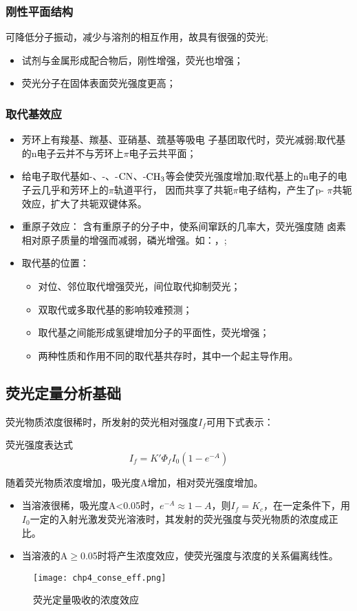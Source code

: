 \subsubsection{刚性平面结构}
可降低分子振动，减少与溶剂的相互作用，故具有很强的荧光;
\begin{itemize}
	\item 试剂与金属形成配合物后，刚性增强，荧光也增强；
	\item 荧光分子在固体表面荧光强度更高；
\end{itemize}
\subsubsection{取代基效应}
\begin{itemize}
	\item 芳环上有羧基、羰基、亚硝基、巯基等吸电 子基团取代时，荧光减弱;取代基的n电子云并不与芳环上$\pi$电子云共平面；
	\item 给电子取代基如-、-、-$\ce{CN}$、-$\ce{CH_{3}}$等会使荧光强度增加;取代基上的n电子的电子云几乎和芳环上的$\pi$轨道平行， 因而共享了共轭$\pi$电子结构，产生了p- $\pi$共轭效应，扩大了共轭双键体系。
	\item 重原子效应： 含有重原子的分子中，使系间窜跃的几率大，荧光强度随 卤素相对原子质量的增强而减弱，磷光增强。如：，;
	\item 取代基的位置：
	\begin{itemize}
		\item 对位、邻位取代增强荧光，间位取代抑制荧光；
		\item 双取代或多取代基的影响较难预测；
		\item 取代基之间能形成氢键增加分子的平面性，荧光增强；
		\item 两种性质和作用不同的取代基共存时，其中一个起主导作用。
	\end{itemize}
\end{itemize}

\subsection{荧光定量分析基础}
荧光物质浓度很稀时，所发射的荧光相对强度$I_{f}$可用下式表示：
\begin{theorem*}{荧光强度表达式}
	\begin{equation*}
		I_{f}=K'\Phi_{f}I_{0}(1-e^{-A})
	\end{equation*}
\end{theorem*}
随着荧光物质浓度增加，吸光度A增加，相对荧光强度增加。
\begin{itemize}
	\item 当溶液很稀，吸光度A<0.05时，$e^{-A}\approx 1-A$，则$I_{f}=K_{c}$，在一定条件下，用$I_0$一定的入射光激发荧光溶液时，其发射的荧光强度与荧光物质的浓度成正比。
	\item 当溶液的A$\geq$0.05时将产生浓度效应，使荧光强度与浓度的关系偏离线性。
\end{itemize}
\begin{figure}
	\centering
	\texttt{[image: chp4\_conse\_eff.png]}
	\label{fig:chp4conseeff}
	\caption{荧光定量吸收的浓度效应}
\end{figure}
